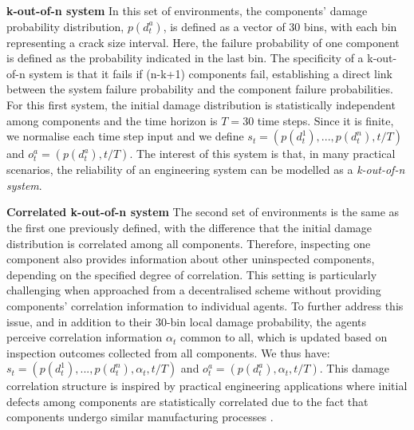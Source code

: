 \textbf{k-out-of-n system}
In this set of environments, the components' damage probability distribution, $p(d^a_t)$, is defined as a vector of 30 bins, with each bin representing a crack size interval.
Here, the failure probability of one component is defined as the probability indicated in the last bin.
The specificity of a k-out-of-n system is that it fails if (n-k+1) components fail, establishing a direct link between the system failure probability and the component failure probabilities.
For this first system, the initial damage distribution is statistically independent among components and the time horizon is $T=30$ time steps.
Since it is finite, we normalise each time step input and we define $s_t = (p(d^1_t),..., p(d^n_t), t/T)$ and $o^a_t=(p(d^a_t), t/T)$.
The interest of this system is that, in many practical scenarios, the reliability of an engineering system can be modelled as a \textit{k-out-of-n system}.

\textbf{Correlated k-out-of-n system}
The second set of environments is the same as the first one previously defined, with the difference that the initial damage distribution is correlated among all components.
Therefore, inspecting one component also provides information about other uninspected components, depending on the specified degree of correlation.
This setting is particularly challenging when approached from a decentralised scheme without providing components' correlation information to individual agents.
To further address this issue, and in addition to their 30-bin local damage probability, the agents perceive correlation information $\alpha_t$ common to all, which is updated based on inspection outcomes collected from all components.
We thus have: $s_t = (p(d^1_t),..., p(d^n_t),\alpha_t, t/T)$ and $o^a_t=(p(d^a_t), \alpha_t, t/T)$.
This damage correlation structure is inspired by practical engineering applications where initial defects among components are statistically correlated due to the fact that components undergo similar manufacturing processes \citep{morato2022optimal}.

